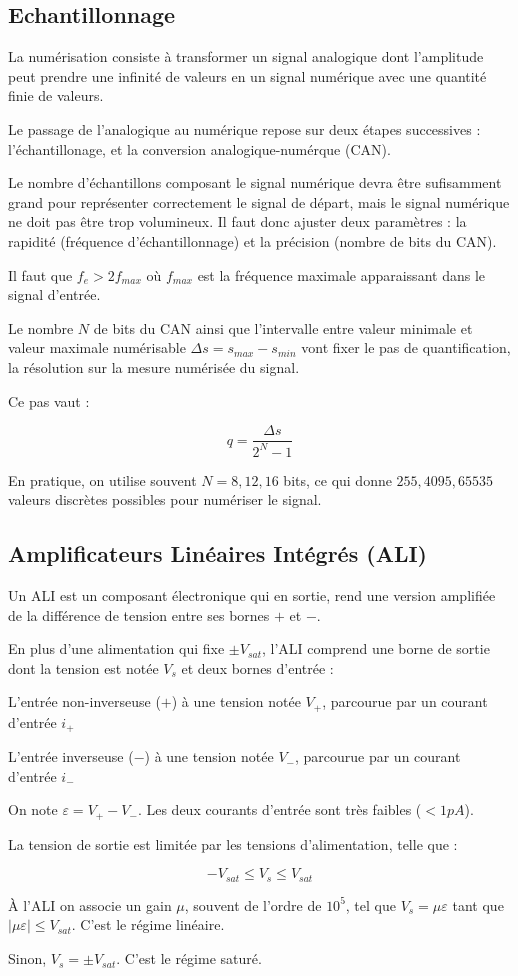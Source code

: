 \documentclass[a4paper,12pt]{book}
\newcommand{\Def}[2]{\begin{tcolorbox}[colback=white,colframe=red!10!green!20!blue!75!, title=Définition : #1]#2\end{tcolorbox}}
\newcommand{\Thr}[2]{\begin{tcolorbox}[sharp corners, colback=white,colframe=red!10!blue!30!green!75!, title=Théorème : #1]#2\end{tcolorbox}}
\begin{document}
\subsection{Echantillonnage}
\Def{}{La numérisation consiste à transformer un signal analogique dont l'amplitude peut prendre une infinité de valeurs en un signal numérique avec une quantité finie de valeurs.
\par Le passage de l'analogique au numérique repose sur deux étapes successives : l'échantillonage, et la conversion analogique-numérque (CAN).
\par Le nombre d'échantillons composant le signal numérique devra être sufisamment grand pour représenter correctement le signal de départ, mais le signal numérique ne doit pas être trop volumineux. Il faut donc ajuster deux paramètres : la rapidité (fréquence d'échantillonnage) et la précision (nombre de bits du CAN).}
\Thr{Critère de Shannon}{Il faut que $f_e>2f_{max}$ où $f_{max}$ est la fréquence maximale apparaissant dans le signal d'entrée.}
\Thr{Précision de la quantification}{Le nombre $N$ de bits du CAN ainsi que l'intervalle entre valeur minimale et valeur maximale numérisable $\Delta s = s_{max}-s_{min}$ vont fixer le pas de quantification, la résolution sur la mesure numérisée du signal.
\par Ce pas vaut :
\par $$q =\frac{\Delta s}{2^N-1}$$
\par En pratique, on utilise souvent $N=8,12,16$ bits, ce qui donne $255,4095,65535$ valeurs discrètes possibles pour numériser le signal.}

\subsection{Amplificateurs Linéaires Intégrés (ALI)}
\Def{ALI}{Un ALI est un composant électronique qui en sortie, rend une version amplifiée de la différence de tension entre ses bornes $+$ et $-$.
\par En plus d'une alimentation qui fixe $\pm V_{sat}$, l'ALI comprend une borne de sortie dont la tension est notée $V_s$ et deux bornes d'entrée :
\par L'entrée non-inverseuse ($+$) à une tension notée $V_+$, parcourue par un courant d'entrée $i_+$
\par L'entrée inverseuse ($-$) à une tension notée $V_-$, parcourue par un courant d'entrée $i_-$
\par On note $\varepsilon =V_+-V_-$. Les deux courants d'entrée sont très faibles ($<1pA$).
\par La tension de sortie est limitée par les tensions d'alimentation, telle que :
\par $$-V_{sat} \leq V_s \leq V_{sat}$$
\par À l'ALI on associe un gain $\mu$, souvent de l'ordre de $10^5$, tel que $V_s = \mu\varepsilon$ tant que $\vert\mu\varepsilon\vert\leq V_{sat}$. C'est le régime linéaire.
\par Sinon, $V_s = \pm V_{sat}$. C'est le régime saturé.}
\end{document}
